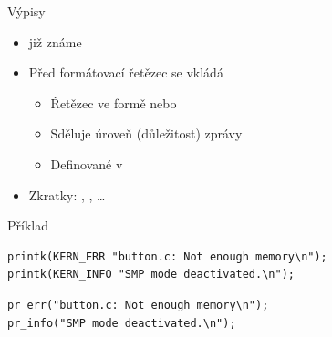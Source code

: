 \begin{frame}[fragile]{Výpisy}

  \begin{itemize}
    \item {} již známe

    \pause

    \item Před formátovací řetězec se vkládá 
    \begin{itemize}
      \item Řetězec ve formě  nebo 

      \pause

      \item Sděluje úroveň (důležitost) zprávy
      \item Definované v 
    \end{itemize}

    \pause

    \item Zkratky: , , \dots
  \end{itemize}


  \begin{block}{Příklad}
    \begin{lstlisting}
printk(KERN_ERR "button.c: Not enough memory\n");
printk(KERN_INFO "SMP mode deactivated.\n");
    \end{lstlisting}


    \begin{lstlisting}
pr_err("button.c: Not enough memory\n");
pr_info("SMP mode deactivated.\n");
    \end{lstlisting}
  \end{block}

\end{frame}

